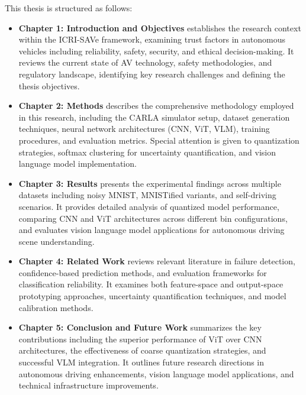 This thesis is structured as follows:

\begin{itemize}
    \item \textbf{Chapter 1: Introduction and Objectives} establishes the research context within the ICRI-SAVe framework, examining trust factors in autonomous vehicles including reliability, safety, security, and ethical decision-making. It reviews the current state of AV technology, safety methodologies, and regulatory landscape, identifying key research challenges and defining the thesis objectives.
    
    \item \textbf{Chapter 2: Methods} describes the comprehensive methodology employed in this research, including the CARLA simulator setup, dataset generation techniques, neural network architectures (CNN, ViT, VLM), training procedures, and evaluation metrics. Special attention is given to quantization strategies, softmax clustering for uncertainty quantification, and vision language model implementation.
    
    \item \textbf{Chapter 3: Results} presents the experimental findings across multiple datasets including noisy MNIST, MNISTified variants, and self-driving scenarios. It provides detailed analysis of quantized model performance, comparing CNN and ViT architectures across different bin configurations, and evaluates vision language model applications for autonomous driving scene understanding.
    
    \item \textbf{Chapter 4: Related Work} reviews relevant literature in failure detection, confidence-based prediction methods, and evaluation frameworks for classification reliability. It examines both feature-space and output-space prototyping approaches, uncertainty quantification techniques, and model calibration methods.
    
    \item \textbf{Chapter 5: Conclusion and Future Work} summarizes the key contributions including the superior performance of ViT over CNN architectures, the effectiveness of coarse quantization strategies, and successful VLM integration. It outlines future research directions in autonomous driving enhancements, vision language model applications, and technical infrastructure improvements.
\end{itemize}